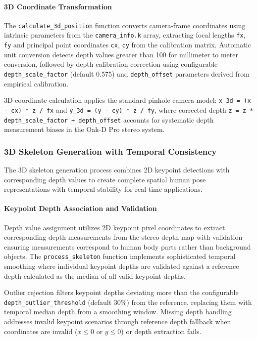 \paragraph{3D Coordinate Transformation}

The \texttt{calculate\_3d\_position} function converts camera-frame coordinates using intrinsic parameters from the \texttt{camera\_info.k} array, extracting focal lengths \texttt{fx}, \texttt{fy} and principal point coordinates \texttt{cx}, \texttt{cy} from the calibration matrix. Automatic unit conversion detects depth values greater than 100 for millimeter to meter conversion, followed by depth calibration correction using configurable \texttt{depth\_scale\_factor} (default 0.575) and \texttt{depth\_offset} parameters derived from empirical calibration.

3D coordinate calculation applies the standard pinhole camera model: \texttt{x\_3d = (x - cx) * z / fx} and \texttt{y\_3d = (y - cy) * z / fy}, where corrected depth \texttt{z = z * depth\_scale\_factor + depth\_offset} accounts for systematic depth measurement biases in the Oak-D Pro stereo system.

\subsubsection{3D Skeleton Generation with Temporal Consistency}

The 3D skeleton generation process combines 2D keypoint detections with corresponding depth values to create complete spatial human pose representations with temporal stability for real-time applications.

\paragraph{Keypoint Depth Association and Validation}

Depth value assignment utilizes 2D keypoint pixel coordinates to extract corresponding depth measurements from the stereo depth map with validation ensuring measurements correspond to human body parts rather than background objects. The \texttt{process\_skeleton} function implements sophisticated temporal smoothing where individual keypoint depths are validated against a reference depth calculated as the median of all valid keypoint depths.

Outlier rejection filters keypoint depths deviating more than the configurable \texttt{depth\_outlier\_threshold} (default 30\%) from the reference, replacing them with temporal median depth from a smoothing window. Missing depth handling addresses invalid keypoint scenarios through reference depth fallback when coordinates are invalid ($x \leq 0$ or $y \leq 0$) or depth extraction fails.

